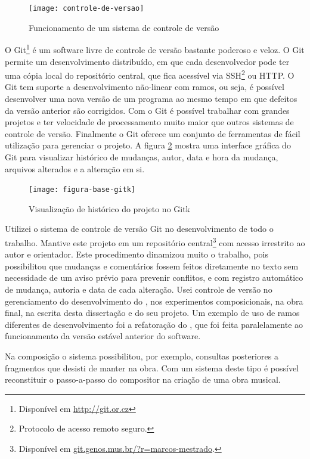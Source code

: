 \begin{figure}
  \centering
  \texttt{[image: controle-de-versao]}
  \caption{Funcionamento de um sistema de controle de versão}
  \label{fig:controle-de-versao}
\end{figure}

O Git\footnote{Disponível em \url{http://git.or.cz}} é um software
livre de controle de versão bastante poderoso e veloz. O Git permite
um desenvolvimento distribuído, em que cada desenvolvedor pode ter uma
cópia local do repositório central, que fica acessível via
SSH\footnote{Protocolo de acesso remoto seguro.} ou HTTP. O Git tem
suporte a desenvolvimento não-linear com ramos, ou seja, é possível
desenvolver uma nova versão de um programa ao mesmo tempo em que
defeitos da versão anterior são corrigidos. Com o Git é possível
trabalhar com grandes projetos e ter velocidade de processamento muito
maior que outros sistemas de controle de versão. Finalmente o Git
oferece um conjunto de ferramentas de fácil utilização para gerenciar
o projeto. A figura \ref{fig:historico-git} mostra uma interface
gráfica do Git para visualizar histórico de mudanças, autor, data e
hora da mudança, arquivos alterados e a alteração em si.

\begin{figure}
  \centering
  \texttt{[image: figura-base-gitk]}
  \caption{Visualização de histórico do projeto no Gitk}
  \label{fig:historico-git}
\end{figure}

Utilizei o sistema de controle de versão Git no desenvolvimento de
todo o trabalho. Mantive este projeto em um repositório
central\footnote{Disponível em
  \url{git.genos.mus.br/?r=marcos-mestrado}.} com acesso irrestrito ao
autor e orientador. Este procedimento dinamizou muito o trabalho, pois
possibilitou que mudanças e comentários fossem feitos diretamente no
texto sem necessidade de um aviso prévio para prevenir conflitos, e
com registro automático de mudança, autoria e data de cada
alteração. Usei controle de versão no gerenciamento do desenvolvimento
do \goiaba{}, nos experimentos composicionais, na obra final, na
escrita desta dissertação e do seu projeto. Um exemplo de uso de ramos
diferentes de desenvolvimento foi a refatoração do \goiaba{}, que foi
feita paralelamente ao funcionamento da versão estável anterior do
software.

Na composição o sistema possibilitou, por exemplo, consultas
posteriores a fragmentos que desisti de manter na obra. Com um sistema
deste tipo é possível reconstituir o passo-a-passo do compositor na
criação de uma obra musical.

